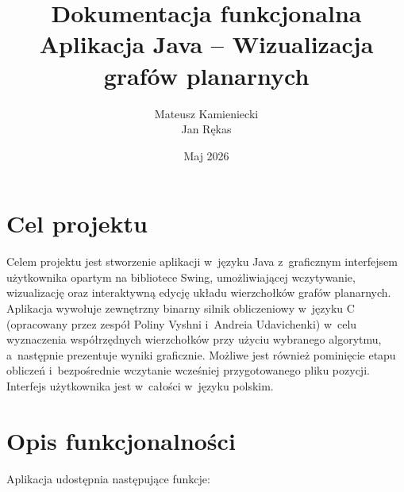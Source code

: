 \documentclass[12pt,a4paper]{article}
\title{\textbf{Dokumentacja funkcjonalna}\\\large Aplikacja Java -- Wizualizacja grafów planarnych}
\author{Mateusz Kamieniecki \\ Jan Rękas}
\date{Maj 2026}
\begin{document}
\maketitle
\tableofcontents
\newpage

\section{Cel projektu}

Celem projektu jest stworzenie aplikacji w~języku Java z~graficznym interfejsem użytkownika opartym na bibliotece Swing, umożliwiającej wczytywanie, wizualizację oraz interaktywną edycję układu wierzchołków grafów planarnych. Aplikacja wywołuje zewnętrzny binarny silnik obliczeniowy w~języku C (opracowany przez zespół Poliny Vyshni i~Andreia Udavichenki) w~celu wyznaczenia współrzędnych wierzchołków przy użyciu wybranego algorytmu, a~następnie prezentuje wyniki graficznie. Możliwe jest również pominięcie etapu obliczeń i~bezpośrednie wczytanie wcześniej przygotowanego pliku pozycji. Interfejs użytkownika jest w~całości w~języku polskim.

\section{Opis funkcjonalności}

Aplikacja udostępnia następujące funkcje:
\end{document}

